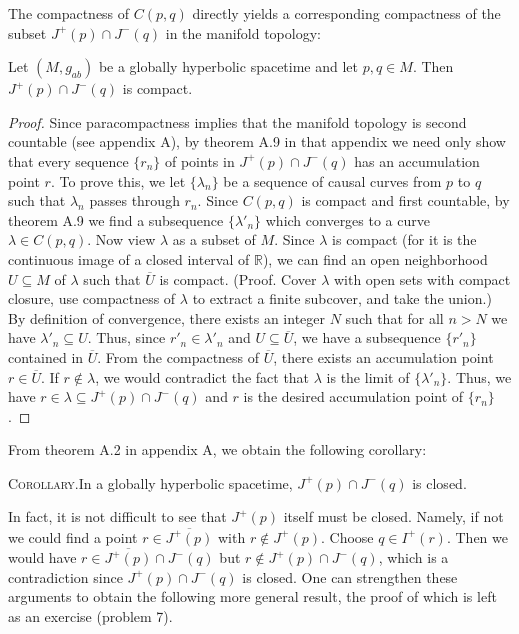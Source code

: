 The compactness of \(C(p,q)\) directly yields a corresponding compactness of the
subset \(J^+(p)\cap J^-(q)\) in the manifold topology:

\begin{theorem}\label{thm:8.3.10}
Let \((M,g_{ab})\) be a globally hyperbolic spacetime and let \(p,q\in M\). Then
\(J^+(p)\cap J^-(q)\) is compact.
\end{theorem}
\begin{proof}
Since paracompactness implies that the manifold topology is second countable (see
appendix A), by theorem A.9 in that appendix we need only show that every sequence
\(\{r_n\}\) of points in \(J^+(p)\cap J^-(q)\) has an accumulation point \(r\). To
prove this, we let \(\{\lambda_n\}\) be a sequence of causal curves from \(p\) to
\(q\) such that \(\lambda_n\) passes through \(r_n\). Since \(C(p,q)\) is compact and
first countable, by theorem A.9 we find a subsequence \(\{\lambda'_n\}\) which
converges to a curve \(\lambda\in C(p,q)\). Now view \(\lambda\) as a subset of
\(M\). Since \(\lambda\) is compact (for it is the continuous image of a closed
interval of \(\mathbb{R}\)), we can find an open neighborhood \(U\subseteq M\) of
\(\lambda\) such that \(\overline U\) is compact. (Proof. Cover \(\lambda\) with
open sets with compact closure, use compactness of \(\lambda\) to extract a finite
subcover, and take the union.) By definition of convergence, there exists an integer
\(N\) such that for all \(n>N\) we have \(\lambda'_n\subseteq U\). Thus, since
\(r'_n\in\lambda'_n\) and \(U\subseteq\overline U\), we have a subsequence
\(\{r'_n\}\) contained in \(\overline U\). From the compactness of \(\overline U\),
there exists an accumulation point \(r\in\overline U\). If \(r\notin\lambda\), we
would contradict the fact that \(\lambda\) is the limit of \(\{\lambda'_n\}\). Thus,
we have \(r\in\lambda\subseteq J^+(p)\cap J^-(q)\) and \(r\) is the desired
accumulation point of \(\{r_n\}\).
\end{proof}

From theorem A.2 in appendix A, we obtain the following corollary:

\medskip
\noindent\textsc{Corollary.}\quad In a globally hyperbolic spacetime,
\(J^+(p)\cap J^-(q)\) is closed.
\medskip

In fact, it is not difficult to see that \(J^+(p)\) itself must be closed. Namely, if
not we could find a point \(r\in\overline{J^+(p)}\) with \(r\notin J^+(p)\). Choose
\(q\in I^+(r)\). Then we would have \(r\in\overline{J^+(p)}\cap J^-(q)\) but
\(r\notin J^+(p)\cap J^-(q)\), which is a contradiction since
\(J^+(p)\cap J^-(q)\) is closed. One can strengthen these arguments to obtain the
following more general result, the proof of which is left as an exercise (problem 7).

